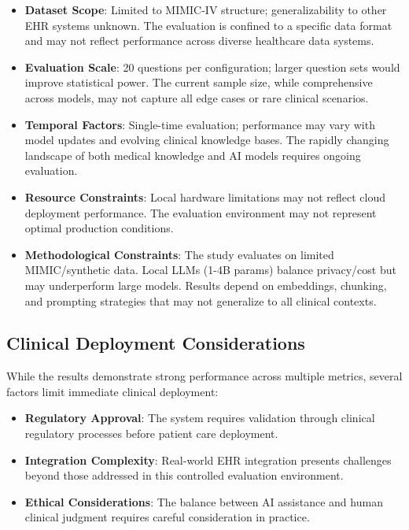 \begin{itemize}
    \item \textbf{Dataset Scope}: Limited to MIMIC-IV structure; generalizability to other EHR systems unknown. The evaluation is confined to a specific data format and may not reflect performance across diverse healthcare data systems.
    
    \item \textbf{Evaluation Scale}: 20 questions per configuration; larger question sets would improve statistical power. The current sample size, while comprehensive across models, may not capture all edge cases or rare clinical scenarios.
    
    \item \textbf{Temporal Factors}: Single-time evaluation; performance may vary with model updates and evolving clinical knowledge bases. The rapidly changing landscape of both medical knowledge and AI models requires ongoing evaluation.
    
    \item \textbf{Resource Constraints}: Local hardware limitations may not reflect cloud deployment performance. The evaluation environment may not represent optimal production conditions.
    
    \item \textbf{Methodological Constraints}: The study evaluates on limited MIMIC/synthetic data. Local LLMs (1-4B params) balance privacy/cost but may underperform large models. Results depend on embeddings, chunking, and prompting strategies that may not generalize to all clinical contexts.
\end{itemize}

\subsection{Clinical Deployment Considerations}

While the results demonstrate strong performance across multiple metrics, several factors limit immediate clinical deployment:

\begin{itemize}
    \item \textbf{Regulatory Approval}: The system requires validation through clinical regulatory processes before patient care deployment.
    
    \item \textbf{Integration Complexity}: Real-world EHR integration presents challenges beyond those addressed in this controlled evaluation environment.
    
    \item \textbf{Ethical Considerations}: The balance between AI assistance and human clinical judgment requires careful consideration in practice.
\end{itemize}

